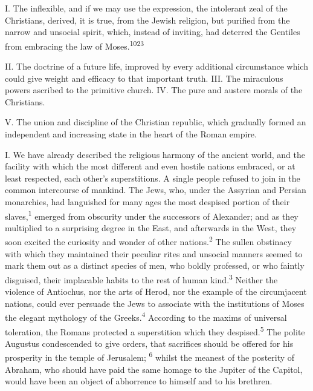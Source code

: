 I. The inflexible, and if we may use the expression, the
intolerant zeal of the Christians, derived, it is true, from the
Jewish religion, but purified from the narrow and unsocial
spirit, which, instead of inviting, had deterred the Gentiles
from embracing the law of Moses.\textsuperscript{1023}

II. The doctrine of a future life, improved by every additional
circumstance which could give weight and efficacy to that
important truth. III. The miraculous powers ascribed to the
primitive church. IV. The pure and austere morals of the
Christians.

V. The union and discipline of the Christian republic, which
gradually formed an independent and increasing state in the heart
of the Roman empire.


I. We have already described the religious harmony of the ancient
world, and the facility with which the most different and even
hostile nations embraced, or at least respected, each other’s
superstitions. A single people refused to join in the common
intercourse of mankind. The Jews, who, under the Assyrian and
Persian monarchies, had languished for many ages the most
despised portion of their slaves,\textsuperscript{1} emerged from obscurity under
the successors of Alexander; and as they multiplied to a
surprising degree in the East, and afterwards in the West, they
soon excited the curiosity and wonder of other nations.\textsuperscript{2} The
sullen obstinacy with which they maintained their peculiar rites
and unsocial manners seemed to mark them out as a distinct
species of men, who boldly professed, or who faintly disguised,
their implacable habits to the rest of human kind.\textsuperscript{3} Neither the
violence of Antiochus, nor the arts of Herod, nor the example of
the circumjacent nations, could ever persuade the Jews to
associate with the institutions of Moses the elegant mythology of
the Greeks.\textsuperscript{4} According to the maxims of universal toleration,
the Romans protected a superstition which they despised.\textsuperscript{5} The
polite Augustus condescended to give orders, that sacrifices
should be offered for his prosperity in the temple of Jerusalem; \textsuperscript{6}
whilst the meanest of the posterity of Abraham, who should have
paid the same homage to the Jupiter of the Capitol, would have
been an object of abhorrence to himself and to his brethren.

